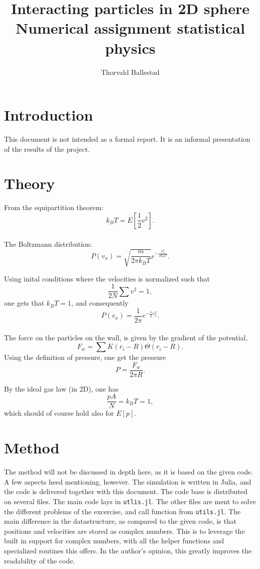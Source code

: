 \documentclass[a4paper,12pt]{article}
\author{Thorvald Ballestad}
\title{Interacting particles in 2D sphere\\Numerical assignment statistical physics}
\begin{document}
\maketitle

\section{Introduction}
This document is not intended as a formal report.
It is an informal presentation of the results of the project.

\section{Theory}
From the equipartition theorem:
\begin{equation}
  k_B T = E[\frac12 v^2].
\end{equation}\\

The Boltzmann distribution:
\begin{equation}
  P(v_x) = \sqrt{\frac{m}{2\pi k_B T}} e^{-\frac{v_x^2}{2 k_B T}}.
\end{equation}

Using inital conditions where the velocities is normalized such that
$$
\frac{1}{2N} \sum v^2 = 1,
$$
one gets that $k_B T = 1$, and consequently
$$
P(v_x) = \frac{1}{2\pi} e^{-\frac12 v_x^2}.
$$\\

The force on the particles on the wall, is given by the gradient of the potential,
$$
F_w = \sum K(r_i - R) \Theta(r_i - R).
$$
Using the definition of pressure, one get the pressure
$$
P = \frac{F_w}{2\pi R}.
$$

By the ideal gas law (in 2D), one has
$$
\frac{p A}{N} = k_B T = 1,
$$
which should of course hold also for $E[p]$.

\section{Method}
The method will not be discussed in depth here, as it is based on the given code.
A few aspects heed mentioning, however.
The simulation is written in Julia, and the code is delivered together with this document.
The code base is distributed on several files.
The main code lays in \verb|utlis.jl|.
The other files are ment to solve the different problems of the excercise, and call function from \verb|utils.jl|.
The main difference in the datastructure, as compared to the given code, is that positions and velocities are stored as complex numbers.
This is to leverage the built in support for complex numbers, with all the helper functions and specialized routines this offers.
In the author's opinion, this greatly improves the readability of the code.
\end{document}

